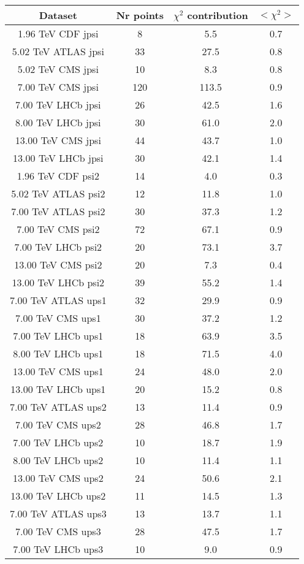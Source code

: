 \begin{table}[h!]
\centering
\begin{tabular}{c|c|c|c}
Dataset & Nr points & $\chi^2$ contribution & $<\chi^2>$ \\
\hline
1.96 TeV CDF jpsi & 8 & 5.5 & 0.7 \\
5.02 TeV ATLAS jpsi & 33 & 27.5 & 0.8 \\
5.02 TeV CMS jpsi & 10 & 8.3 & 0.8 \\
7.00 TeV CMS jpsi & 120 & 113.5 & 0.9 \\
7.00 TeV LHCb jpsi & 26 & 42.5 & 1.6 \\
8.00 TeV LHCb jpsi & 30 & 61.0 & 2.0 \\
13.00 TeV CMS jpsi & 44 & 43.7 & 1.0 \\
13.00 TeV LHCb jpsi & 30 & 42.1 & 1.4 \\
1.96 TeV CDF psi2 & 14 & 4.0 & 0.3 \\
5.02 TeV ATLAS psi2 & 12 & 11.8 & 1.0 \\
7.00 TeV ATLAS psi2 & 30 & 37.3 & 1.2 \\
7.00 TeV CMS psi2 & 72 & 67.1 & 0.9 \\
7.00 TeV LHCb psi2 & 20 & 73.1 & 3.7 \\
13.00 TeV CMS psi2 & 20 & 7.3 & 0.4 \\
13.00 TeV LHCb psi2 & 39 & 55.2 & 1.4 \\
7.00 TeV ATLAS ups1 & 32 & 29.9 & 0.9 \\
7.00 TeV CMS ups1 & 30 & 37.2 & 1.2 \\
7.00 TeV LHCb ups1 & 18 & 63.9 & 3.5 \\
8.00 TeV LHCb ups1 & 18 & 71.5 & 4.0 \\
13.00 TeV CMS ups1 & 24 & 48.0 & 2.0 \\
13.00 TeV LHCb ups1 & 20 & 15.2 & 0.8 \\
7.00 TeV ATLAS ups2 & 13 & 11.4 & 0.9 \\
7.00 TeV CMS ups2 & 28 & 46.8 & 1.7 \\
7.00 TeV LHCb ups2 & 10 & 18.7 & 1.9 \\
8.00 TeV LHCb ups2 & 10 & 11.4 & 1.1 \\
13.00 TeV CMS ups2 & 24 & 50.6 & 2.1 \\
13.00 TeV LHCb ups2 & 11 & 14.5 & 1.3 \\
7.00 TeV ATLAS ups3 & 13 & 13.7 & 1.1 \\
7.00 TeV CMS ups3 & 28 & 47.5 & 1.7 \\
7.00 TeV LHCb ups3 & 10 & 9.0 & 0.9 \\

\end{tabular}
\end{table}
